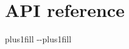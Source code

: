 \documentclass[a4paper,11pt,english]{sphinxmanual}
\begin{document}
\sphinxstepscope


\chapter{API reference}
\label{\detokenize{api:api-reference}}\label{\detokenize{api::doc}}

\begin{savenotes}
\sphinxatlongtablestart
\sphinxthistablewithglobalstyle
\sphinxthistablewithnovlinesstyle
\makeatletter
  \LTleft \@totalleftmargin plus1fill
  \LTright\dimexpr\columnwidth-\@totalleftmargin-\linewidth\relax plus1fill
\makeatother
\begin{longtable}{}
\sphinxtoprule
\endfirsthead

\\
\sphinxtoprule
\endhead

\sphinxbottomrule
{}\\
\endfoot


\end{longtable}
\end{savenotes}
\end{document}
